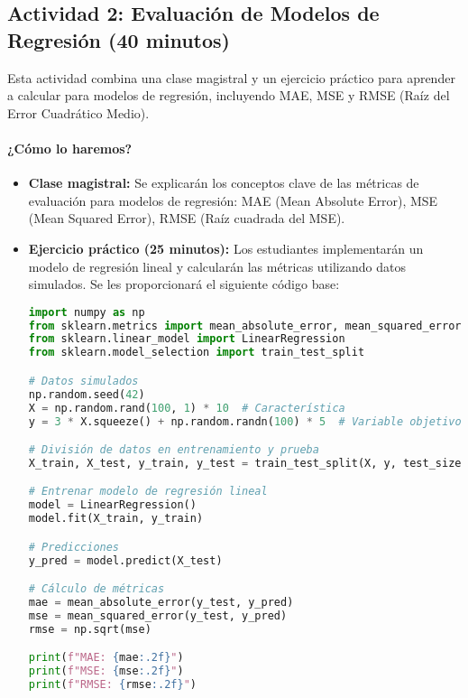 \documentclass[a4,11pt]{aleph-notas}
\begin{document}
\subsection*{Actividad 2: Evaluación de Modelos de Regresión (40 minutos)}

Esta actividad combina una clase magistral y un ejercicio práctico para aprender a calcular para modelos de regresión, incluyendo MAE, MSE y RMSE (Raíz del Error Cuadrático Medio).

\paragraph{¿Cómo lo haremos?}  

\begin{itemize}[leftmargin=*]
    \item \textbf{Clase magistral:}  
    Se explicarán los conceptos clave de las métricas de evaluación para modelos de regresión: MAE (Mean Absolute Error), MSE (Mean Squared Error), RMSE (Raíz cuadrada del MSE).

    \item \textbf{Ejercicio práctico (25 minutos):}  
    Los estudiantes implementarán un modelo de regresión lineal y calcularán las métricas utilizando datos simulados. Se les proporcionará el siguiente código base:

\begin{pycodigo}
\begin{lstlisting}[language=Python]
import numpy as np
from sklearn.metrics import mean_absolute_error, mean_squared_error
from sklearn.linear_model import LinearRegression
from sklearn.model_selection import train_test_split

# Datos simulados
np.random.seed(42)
X = np.random.rand(100, 1) * 10  # Característica
y = 3 * X.squeeze() + np.random.randn(100) * 5  # Variable objetivo

# División de datos en entrenamiento y prueba
X_train, X_test, y_train, y_test = train_test_split(X, y, test_size=0.2, random_state=42)

# Entrenar modelo de regresión lineal
model = LinearRegression()
model.fit(X_train, y_train)

# Predicciones
y_pred = model.predict(X_test)

# Cálculo de métricas
mae = mean_absolute_error(y_test, y_pred)
mse = mean_squared_error(y_test, y_pred)
rmse = np.sqrt(mse)

print(f"MAE: {mae:.2f}")
print(f"MSE: {mse:.2f}")
print(f"RMSE: {rmse:.2f}")
\end{lstlisting}
\end{pycodigo}


\end{itemize}
\end{document}
